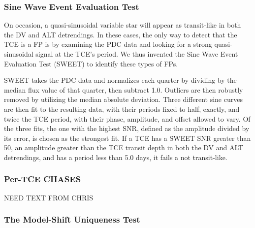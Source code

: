 



\subsubsection{Sine Wave Event Evaluation Test}
\label{s:sweetntl}

On occasion, a quasi-sinusoidal variable star will appear as transit-like in both the DV and ALT detrendings. In these cases, the only way to detect that the TCE is a FP is by examining the PDC data and looking for a strong quasi-sinusoidal signal at the TCE's period. We thus invented the Sine Wave Event Evaluation Test (SWEET) to identify these types of FPs.

SWEET takes the PDC data and normalizes each quarter by dividing by the median flux value of that quarter, then subtract 1.0. Outliers are then robustly removed by utilizing the median absolute deviation. Three different sine curves are then fit to the resulting data, with their periods fixed to half, exactly, and twice the TCE period, with their phase, amplitude, and offset allowed to vary. Of the three fits, the one with the highest SNR, defined as the amplitude divided by its error, is chosen as the strongest fit. If a TCE has a SWEET SNR greater than 50, an amplitude greater than the TCE transit depth in both the DV and ALT detrendings, and has a period less than 5.0 days, it fails a not transit-like.




\subsubsection{Per-TCE CHASES}
\label{s:tcechases}
NEED TEXT FROM CHRIS




\subsubsection{The Model-Shift Uniqueness Test}
\label{s:ms}

